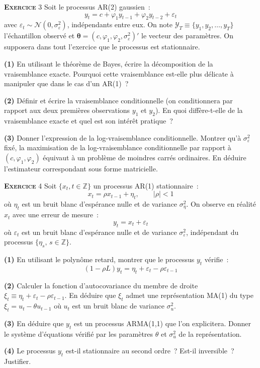 \documentclass[10pt,a4paper,notitlepage,twocolumn]{article}
\newcommand{\exercice}[1]{\textsc{\textbf{Exercice}} #1}
\newcommand{\question}[1]{\textbf{(#1)}}
\begin{document}
\bigskip

\exercice{3} Soit le processus AR(2) gaussien~:
\[
y_t = c + \varphi_1 y_{t-1} + \varphi_2 y_{t-2} + \varepsilon_t
\]
avec $\varepsilon_t \sim \mathcal{N}(0,\sigma_{\varepsilon}^2)$,
indépendants entre eux. On note $\mathcal Y_T \equiv
\{y_1,y_2,\dots,y_T\}$ l'échantillon observé et
$\bm{\theta}=(c,\varphi_1,\varphi_2,\sigma_{\varepsilon}^2)'$ le
vecteur des paramètres. On supposera dans tout l'exercice que le
processus est stationnaire.\newline

\question{1} En utilisant le théorème de Bayes, écrire la
décomposition de la vraisemblance exacte. Pourquoi cette vraisemblance
est-elle plus délicate à manipuler que dans le cas d'un AR(1)~?\newline

\question{2} Définir et écrire la vraisemblance conditionnelle (on
conditionnera par rapport aux deux premières observations $y_1$ et
$y_2$). En quoi diffère-t-elle de la vraisemblance exacte et quel est
son intérêt pratique~?\newline

\question{3} Donner l'expression de la log-vraisemblance
conditionnelle. Montrer qu'à $\sigma_{\varepsilon}^2$ fixé, la
maximisation de la log-vraisemblance conditionnelle par rapport à
$(c,\varphi_1,\varphi_2)$ équivaut à un problème de moindres carrés
ordinaires. En déduire l'estimateur correspondant sous forme
matricielle.\newline

\bigskip

\exercice{4} Soit $\{x_t,t\in\mathbb Z\}$ un processus AR(1)
stationnaire~:
\[
x_t = \rho x_{t-1} + \eta_t,\qquad |\rho|<1
\]
où $\eta_t$ est un bruit blanc d'espérance nulle et de variance
$\sigma_{\eta}^2$. On observe en réalité $x_t$ avec une erreur de
mesure~:
\[
y_t = x_t + \varepsilon_t
\]
où $\varepsilon_t$ est un bruit blanc d'espérance nulle et de variance
$\sigma_{\varepsilon}^2$, indépendant du processus
$\{\eta_s,\,s\in\mathbb Z\}$.\newline

\question{1} En utilisant le polynôme retard, montrer que le processus
$y_t$ vérifie~:
\[
(1-\rho L) y_t = \eta_t + \varepsilon_t - \rho\varepsilon_{t-1}
\]

\question{2} Calculer la fonction d'autocovariance du membre de droite
$\xi_t \equiv \eta_t + \varepsilon_t - \rho\varepsilon_{t-1}$. En
déduire que $\xi_t$ admet une représentation MA(1) du type $\xi_t =
u_t - \theta u_{t-1}$ où $u_t$ est un bruit blanc de variance
$\sigma_u^2$.\newline

\question{3} En déduire que $y_t$ est un processus ARMA(1,1) que l'on
explicitera. Donner le système d'équations vérifié par les paramètres
$\theta$ et $\sigma_u^2$ de la représentation.\newline

\question{4} Le processus $y_t$ est-il stationnaire au second ordre~?
Est-il inversible~? Justifier.
\end{document}
